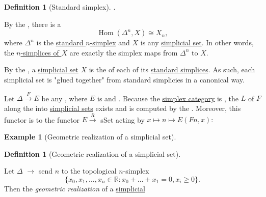 \documentclass[oneside,a4paper]{book}%
\theoremstyle{definition}%
\newtheorem{definition}[theorem]{Definition}%
\newtheorem{example}[theorem]{Example}%
\begin{document}
\begin{Section}
\begin{definition}[{Standard simplex}]
  
  .
\end{definition}\begin{Proposition}\label{rs-0085}\par{}By the , there is a 
\[\operatorname {Hom}(\Delta ^n, X)\cong  X_n,\] where \(\Delta ^n\) is the \hyperref[rs-0084]{standard
\(n\)-simplex} and \(X\) is any \hyperref[rs-0080]{simplicial set}. In other
words, the \hyperref[rs-0081]{\(n\)-simplices of \(X\)} are exactly the simplex maps from
\(\Delta ^n\) to \(X\).\end{Proposition}\begin{Proposition}\label{rs-0087}\par{}By the , a \hyperref[rs-0080]{simplicial set} \(X\) is the
 of each of its \hyperref[rs-0084]{standard simplices}. As such, each
simplicial set is "glued together" from standard simplicies in a canonical way.\end{Proposition}\begin{Proposition}\label{rs-0089}\par{}Let \(\Delta \xrightarrow {F} E\) be any , where \(E\) is
 and . Because the \hyperref[rs-007Z]{simplex
category} is , the  \(L\)
of \(F\) along the  into \hyperref[rs-0080]{simplicial sets}
exists and is computed by the . Moreover, this functor
is  to the functor \(E\xrightarrow {R}\) sSet acting by
\(x\mapsto  n\mapsto  E(Fn, x):\)\end{Proposition}\begin{example}[{Geometric realization of a simplicial set}]\begin{definition}[{Geometric realization of a simplicial set}]\label{rs-008A}\par{}Let \hyperref[rs-007Z]{\(\Delta \)} \(\to \)  send \(n\) to the
topological \(n\)-simplex \[\{x_0,x_1,\dots ,x_n\in \mathbb {R}: x_0+\dots +x_1 = 0, x_i\geq  0\}.\] Then the \emph{geometric realization} of a \hyperref[rs-0080]{simplicial
}
\end{definition}
\end{example}
\end{Section}
\end{document}
